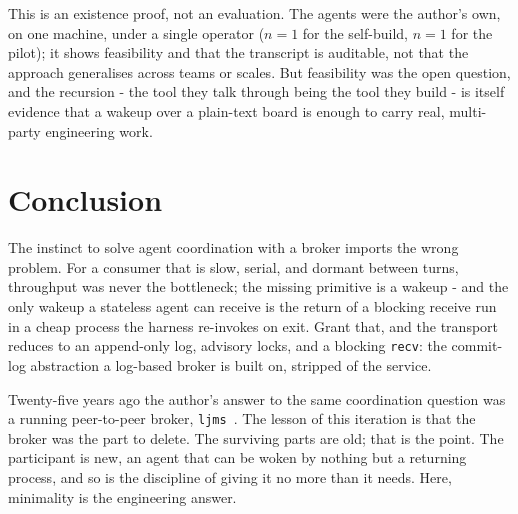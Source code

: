 \documentclass[11pt]{article}
\newcommand{\code}[1]{\texttt{#1}}
\begin{document}
This is an existence proof, not an evaluation. The agents were the author's own, on one machine, under a single operator ($n=1$ for the self-build, $n=1$ for the pilot); it shows feasibility and that the transcript is auditable, not that the approach generalises across teams or scales. But feasibility was the open question, and the recursion - the tool they talk through being the tool they build - is itself evidence that a wakeup over a plain-text board is enough to carry real, multi-party engineering work.

\section{Conclusion}

The instinct to solve agent coordination with a broker imports the wrong problem. For a consumer that is slow, serial, and dormant between turns, throughput was never the bottleneck; the missing primitive is a wakeup - and the only wakeup a stateless agent can receive is the return of a blocking receive run in a cheap process the harness re-invokes on exit. Grant that, and the transport reduces to an append-only log, advisory locks, and a blocking \code{recv}: the commit-log abstraction a log-based broker is built on, stripped of the service.

Twenty-five years ago the author's answer to the same coordination question was a running peer-to-peer broker, \code{ljms}~\cite{ljms}. The lesson of this iteration is that the broker was the part to delete. The surviving parts are old; that is the point. The participant is new, an agent that can be woken by nothing but a returning process, and so is the discipline of giving it no more than it needs. Here, minimality is the engineering answer.
\end{document}
